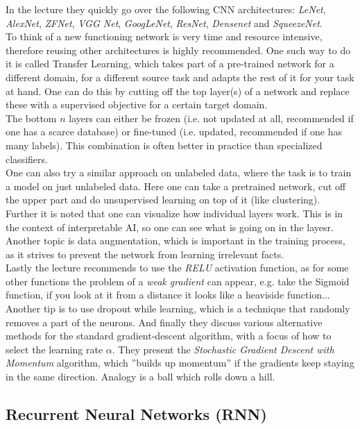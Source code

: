 \documentclass[12pt,a4paper]{article}
\begin{document}
\noindent In the lecture they quickly go over the following CNN architectures: \textit{LeNet}, \textit{AlexNet}, \textit{ZFNet}, \textit{VGG Net}, \textit{GoogLeNet}, \textit{ResNet}, \textit{Densenet} and \textit{SqueezeNet}.\\
To think of a new functioning network is very time and resource intensive, therefore reusing other architectures is highly recommended. One such way to do it is called Transfer Learning, which takes part of a pre-trained network for a different domain, for a different source task and adapts the rest of it for your task at hand. One can do this by cutting off the top layer(s) of a network and replace these with a supervised objective for a certain target domain.\\
The bottom \(n\) layers can either be frozen (i.e. not updated at all, recommended if one has a scarce database) or fine-tuned (i.e. updated, recommended if one has many labels). This combination is often better in practice than specialized classifiers.\\
One can also try a similar approach on unlabeled data, where the task is to train a model on just unlabeled data. Here one can take a pretrained network, cut off the upper part and do unsupervised learning on top of it (like clustering).\\[1em]
Further it is noted that one can visualize how individual layers work. This is in the context of interpretable AI, so one can see what is going on in the layesr. Another topic is data augmentation, which is important in the training process, as it strives to prevent the network from learning irrelevant facts.\\
Lastly the lecture recommends to use the \textit{RELU} activation function, as for some other functions the problem of a \textit{weak gradient} can appear, e.g. take the Sigmoid function, if you look at it from a distance it looks like a heaviside function...\\
Another tip is to use dropout while learning, which is a technique that randomly removes a part of the neurons. And finally they discuss various alternative methods for the standard gradient-descent algorithm, with a focus of how to select the learning rate \(\alpha\). They present the \textit{Stochastic Gradient Descent with Momentum} algorithm, which ''builds up momentum'' if the gradients keep staying in the same direction. Analogy is a ball which rolls down a hill.\\[1em]


\subsection{Recurrent Neural Networks (RNN)}
\end{document}
